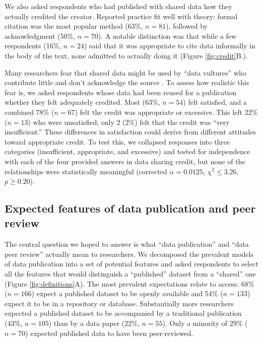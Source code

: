 \documentclass[10pt]{article}
\begin{document}
We also asked respondents who had published with shared data how they actually credited the creator.
Reported practice fit well with theory: formal citation was the most popular method (63\%, $n=81$), followed by acknowledgment (50\%, $n=70$).
A notable distinction was that while a few respondents (16\%, $n=24$) said that it was appropriate to cite data informally in the body of the text, none admitted to actually doing it (Figure \ref{fig:credit}B.).

Many researchers fear that shared data might be used by ``data vultures'' who contribute little and don't acknowledge the source \cite{kim_institutional_2012}.
To assess how realistic this fear is, we asked respondents whose data had been reused for a publication whether they felt adequately credited.
Most (63\%, $n=54$) felt satisfied, and a combined 78\% ($n=67$) felt the credit was appropriate or excessive.
This left 22\% ($n=13$) who were unsatisfied; only 2 (2\%) felt that the credit was ``very insufficient.''
These differences in satisfaction could derive from different attitudes toward appropriate credit.  
To test this, we collapsed responses into three categories (insufficient, appropriate, and excessive) and tested for independence with each of the four provided answers in data sharing credit, but none of the relationships were statistically meaningful (corrected $\alpha= 0.0125$, $\chi^{2}\leq 3.26$, $p\geq 0.20$).

\subsection*{Expected features of data publication and peer review}

The central question we hoped to answer is what ``data publication'' and ``data peer review'' actually mean to researchers.
We decomposed the prevalent models of data publication into a set of potential features and asked respondents to select all the features that would distinguish a ``published'' dataset from a ``shared'' one (Figure \ref{fig:definitions}A).
The most prevalent expectations relate to access: 68\% ($n=166$) expect a published dataset to be openly available and 54\% ($n=133$) expect it to be in a repository or database.
Substantially more researchers expected a published dataset to be accompanied by a traditional publication (43\%, $n=105$) than by a data paper (22\%, $n=55$).
Only a minority of 29\% ($n=70$) expected published data to have been peer-reviewed.
\end{document}
